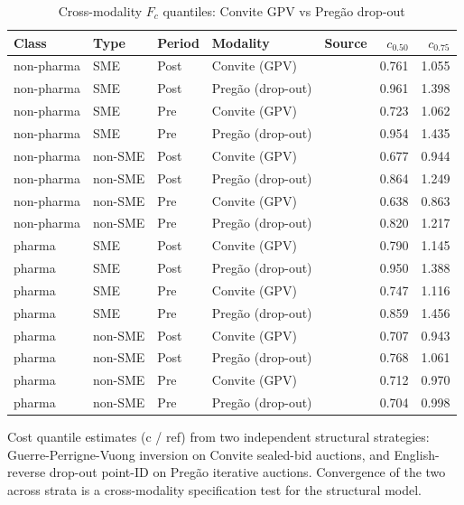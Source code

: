 \begin{table}[htbp]
\centering
\begin{threeparttable}
\caption{Cross-modality $F_c$ quantiles: Convite GPV vs Preg\~ao drop-out}
\label{tab:v3_cross_modality}
\small
\begin{tabular}{lllll rr}
\toprule
Class & Type & Period & Modality & Source & $c_{0.50}$ & $c_{0.75}$ \\
\midrule
non-pharma & SME & Post & Convite (GPV) & & 0.761 & 1.055 \\
non-pharma & SME & Post & Pregão (drop-out) & & 0.961 & 1.398 \\
non-pharma & SME & Pre & Convite (GPV) & & 0.723 & 1.062 \\
non-pharma & SME & Pre & Pregão (drop-out) & & 0.954 & 1.435 \\
non-pharma & non-SME & Post & Convite (GPV) & & 0.677 & 0.944 \\
non-pharma & non-SME & Post & Pregão (drop-out) & & 0.864 & 1.249 \\
non-pharma & non-SME & Pre & Convite (GPV) & & 0.638 & 0.863 \\
non-pharma & non-SME & Pre & Pregão (drop-out) & & 0.820 & 1.217 \\
pharma & SME & Post & Convite (GPV) & & 0.790 & 1.145 \\
pharma & SME & Post & Pregão (drop-out) & & 0.950 & 1.388 \\
pharma & SME & Pre & Convite (GPV) & & 0.747 & 1.116 \\
pharma & SME & Pre & Pregão (drop-out) & & 0.859 & 1.456 \\
pharma & non-SME & Post & Convite (GPV) & & 0.707 & 0.943 \\
pharma & non-SME & Post & Pregão (drop-out) & & 0.768 & 1.061 \\
pharma & non-SME & Pre & Convite (GPV) & & 0.712 & 0.970 \\
pharma & non-SME & Pre & Pregão (drop-out) & & 0.704 & 0.998 \\
\bottomrule
\end{tabular}
\begin{tablenotes}\footnotesize
\item Cost quantile estimates (c / ref) from two independent
structural strategies: Guerre-Perrigne-Vuong inversion on
Convite sealed-bid auctions, and English-reverse drop-out
point-ID on Preg\~ao iterative auctions. Convergence of the two
across strata is a cross-modality specification test for the
structural model.
\end{tablenotes}
\end{threeparttable}
\end{table}
